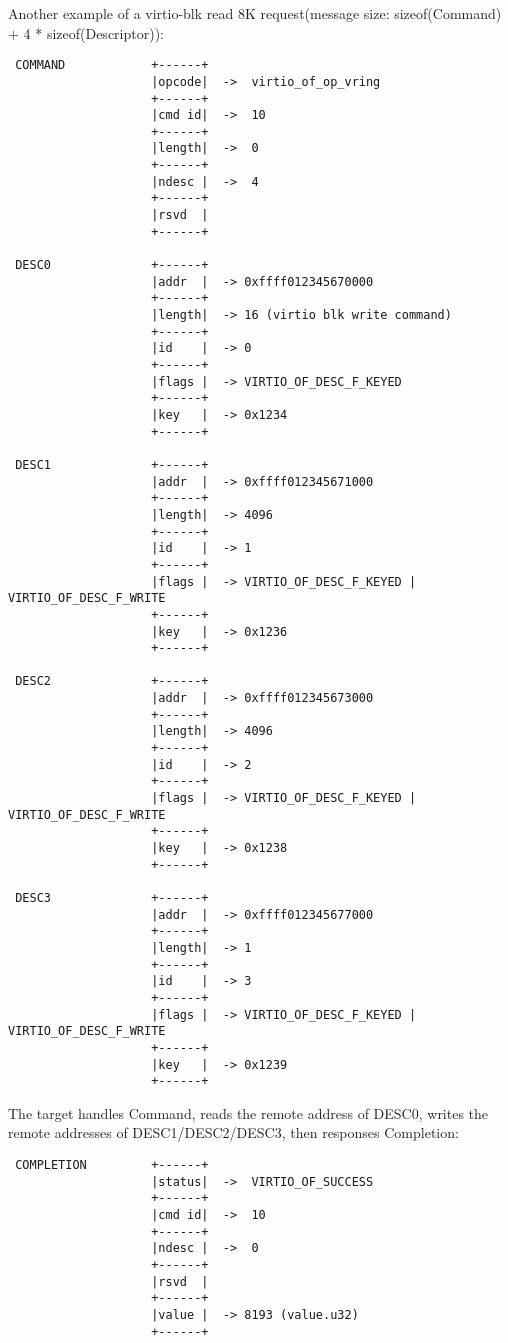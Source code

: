 Another example of a virtio-blk read 8K request(message size: sizeof(Command) + 4 * sizeof(Descriptor)):
\begin{lstlisting}
 COMMAND            +------+
                    |opcode|  ->  virtio_of_op_vring
                    +------+
                    |cmd id|  ->  10
                    +------+
                    |length|  ->  0
                    +------+
                    |ndesc |  ->  4
                    +------+
                    |rsvd  |
                    +------+

 DESC0              +------+
                    |addr  |  -> 0xffff012345670000
                    +------+
                    |length|  -> 16 (virtio blk write command)
                    +------+
                    |id    |  -> 0
                    +------+
                    |flags |  -> VIRTIO_OF_DESC_F_KEYED
                    +------+
                    |key   |  -> 0x1234
                    +------+

 DESC1              +------+
                    |addr  |  -> 0xffff012345671000
                    +------+
                    |length|  -> 4096
                    +------+
                    |id    |  -> 1
                    +------+
                    |flags |  -> VIRTIO_OF_DESC_F_KEYED | VIRTIO_OF_DESC_F_WRITE
                    +------+
                    |key   |  -> 0x1236
                    +------+

 DESC2              +------+
                    |addr  |  -> 0xffff012345673000
                    +------+
                    |length|  -> 4096
                    +------+
                    |id    |  -> 2
                    +------+
                    |flags |  -> VIRTIO_OF_DESC_F_KEYED | VIRTIO_OF_DESC_F_WRITE
                    +------+
                    |key   |  -> 0x1238
                    +------+

 DESC3              +------+
                    |addr  |  -> 0xffff012345677000
                    +------+
                    |length|  -> 1
                    +------+
                    |id    |  -> 3
                    +------+
                    |flags |  -> VIRTIO_OF_DESC_F_KEYED | VIRTIO_OF_DESC_F_WRITE
                    +------+
                    |key   |  -> 0x1239
                    +------+
\end{lstlisting}

The target handles Command, reads the remote address of DESC0, writes the remote addresses of DESC1/DESC2/DESC3, then responses Completion:
\begin{lstlisting}
 COMPLETION         +------+
                    |status|  ->  VIRTIO_OF_SUCCESS
                    +------+
                    |cmd id|  ->  10
                    +------+
                    |ndesc |  ->  0
                    +------+
                    |rsvd  |
                    +------+
                    |value |  -> 8193 (value.u32)
                    +------+
\end{lstlisting}

